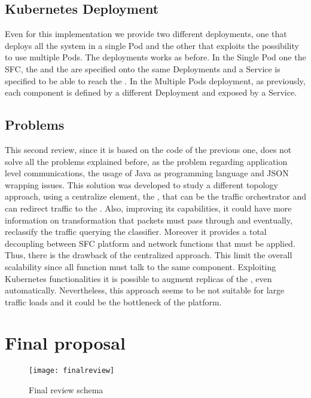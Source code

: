\subsection{Kubernetes Deployment}
Even for this implementation we provide two different deployments, one that
deploys all the system in a single Pod and the other that exploits the
possibility to use multiple Pods. The deployments works as before. In the Single
Pod one the SFC, the \enchainer{} and the \dispatcher{} are specified onto the
same Deployments and a Service is specified to be able to reach the
\enchainer{}. In the Multiple Pods deployment, as previously, each component is
defined by a different Deployment and exposed by a Service.

\subsection{Problems}
This second review, since it is based on the code of the previous one, does not
solve all the problems explained before, as the problem regarding application
level communications, the usage of Java as programming language and JSON
wrapping issues. This solution was developed to study a different topology
approach, using a centralize element, the \dispatcher{}, that can be the traffic
orchestrator and can redirect traffic to the \vnfs{}. Also, improving its
capabilities, it could have more information on transformation that packets must
pass through and eventually, reclassify the traffic querying the classifier.
Moreover it provides a total decoupling between SFC platform and network
functions that must be applied. Thus, there is the drawback of the centralized
approach. This limit the overall scalability since all function must talk to the
same component. Exploiting Kubernetes functionalities it is possible to augment
replicas of the \dispatcher{}, even automatically. Nevertheless, this approach
seems to be not suitable for large traffic loads and it could be the bottleneck
of the platform.

\section{Final proposal}

\begin{figure}
  \centering
  \texttt{[image: finalreview]}
  \caption{Final review schema}
  \label{chap:impl:img:finalreview}
\end{figure}


